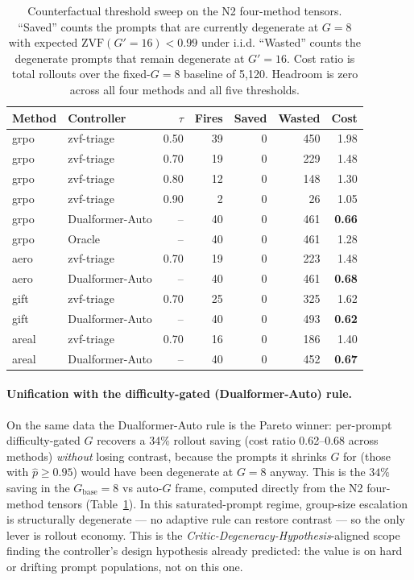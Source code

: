 \begin{table}[t]
\centering
\caption{Counterfactual threshold sweep on the N2 four-method tensors.
``Saved'' counts the prompts that are currently degenerate at
$G{=}8$ with expected $\mathrm{ZVF}(G'{=}16)<0.99$ under i.i.d.
``Wasted'' counts the degenerate prompts that remain degenerate at
$G'{=}16$. Cost ratio is total rollouts over the fixed-$G{=}8$ baseline
of 5{,}120. Headroom is zero across all four methods and all five
thresholds.}
\label{tab:p7-cf-sweep}
\begin{tabular}{llrrrrr}
\toprule
Method & Controller & $\tau$ & Fires & Saved & Wasted & Cost \\
\midrule
grpo  & zvf-triage     & 0.50 & 39 & 0 & 450 & 1.98 \\
grpo  & zvf-triage     & 0.70 & 19 & 0 & 229 & 1.48 \\
grpo  & zvf-triage     & 0.80 & 12 & 0 & 148 & 1.30 \\
grpo  & zvf-triage     & 0.90 &  2 & 0 &  26 & 1.05 \\
grpo  & Dualformer-Auto &  -- & 40 & 0 & 461 & \textbf{0.66} \\
grpo  & Oracle         &  -- & 40 & 0 & 461 & 1.28 \\
\midrule
aero  & zvf-triage     & 0.70 & 19 & 0 & 223 & 1.48 \\
aero  & Dualformer-Auto &  -- & 40 & 0 & 461 & \textbf{0.68} \\
gift  & zvf-triage     & 0.70 & 25 & 0 & 325 & 1.62 \\
gift  & Dualformer-Auto &  -- & 40 & 0 & 493 & \textbf{0.62} \\
areal & zvf-triage     & 0.70 & 16 & 0 & 186 & 1.40 \\
areal & Dualformer-Auto &  -- & 40 & 0 & 452 & \textbf{0.67} \\
\bottomrule
\end{tabular}
\end{table}

\paragraph{Unification with the difficulty-gated (Dualformer-Auto) rule.}
On the same data the Dualformer-Auto rule is the Pareto winner:
per-prompt difficulty-gated $G$ recovers a 34\% rollout saving
(cost ratio 0.62--0.68 across methods) \emph{without} losing contrast,
because the prompts it shrinks $G$ for (those with $\hat p \ge 0.95$)
would have been degenerate at $G{=}8$ anyway. This is the $34\%$
saving in the $G_{\text{base}}{=}8$ vs auto-$G$ frame, computed
directly from the N2 four-method tensors
(Table~\ref{tab:p7-cf-sweep}). In this saturated-prompt regime,
group-size escalation is structurally degenerate --- no adaptive
rule can restore contrast --- so the only lever is rollout economy.
This is the \emph{Critic-Degeneracy-Hypothesis}-aligned
scope finding the controller's design hypothesis already predicted:
the value is on hard or drifting prompt populations, not on this one.

